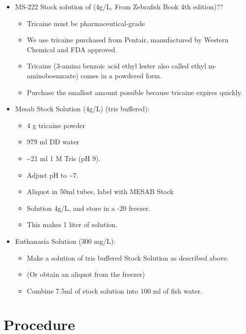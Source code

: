 \documentclass[
  letterpaper,
  DIV=11,
  numbers=noendperiod]{scrreprt}
\providecommand{\tightlist}{%
  \setlength{\itemsep}{0pt}\setlength{\parskip}{0pt}}\usepackage{longtable,booktabs,array}
\begin{document}
\begin{itemize}
\tightlist
\item
  MS-222 Stock solution of (4g/L, From Zebrafish Book 4th edition)??

  \begin{itemize}
  \tightlist
  \item
    Tricaine must be pharmaceutical-grade
  \item
    We use tricaine purchased from Pentair, manufactured by Western
    Chemical and FDA approved.
  \item
    Tricaine (3-amino benzoic acid ethyl lester also called ethyl
    m-aminoboenzoate) comes in a powdered form.
  \item
    Purchase the smallest amount possible because tricaine expires
    quickly.
  \end{itemize}
\item
  Mesab Stock Solution (4g/L) (tris buffered):

  \begin{itemize}
  \tightlist
  \item
    4 g tricaine powder
  \item
    979 ml DD water
  \item
    \textasciitilde21 ml 1 M Tris (pH 9).
  \item
    Adjust pH to \textasciitilde7.
  \item
    Aliquot in 50ml tubes, label with MESAB Stock
  \item
    Solution 4g/L, and store in a -20 freezer.
  \item
    This makes 1 liter of solution.
  \end{itemize}
\item
  Euthanasia Solution (300 mg/L):

  \begin{itemize}
  \tightlist
  \item
    Make a solution of tris buffered Stock Solution as described above.
  \item
    (Or obtain an aliquot from the freezer)
  \item
    Combine 7.5ml of stock solution into 100 ml of fish water.
  \end{itemize}
\end{itemize}

\hypertarget{procedure-57}{%
\section{Procedure}\label{procedure-57}}
\end{document}
